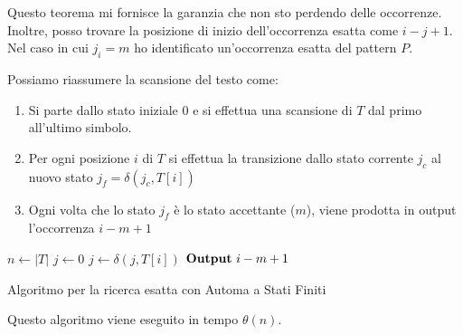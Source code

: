 Questo teorema mi fornisce la garanzia che non sto perdendo delle occorrenze.
Inoltre, posso trovare la posizione di inizio dell'occorrenza esatta come $i - j + 1$.
Nel caso in cui $j_i = m$ ho identificato un'occorrenza esatta del pattern $P$.

Possiamo riassumere la scansione del testo come:
\begin{enumerate}
    \item Si parte dallo stato iniziale $0$ e si effettua una scansione di $T$
          dal primo all'ultimo simbolo.
    \item Per ogni posizione $i$ di $T$ si effettua la transizione dallo stato
          corrente $j_c$ al nuovo stato $j_f = \delta(j_c, T[i])$
    \item Ogni volta che lo stato $j_f$ è lo stato accettante ($m$), viene prodotta
          in output l'occorrenza $i - m + 1$
\end{enumerate}
\begin{algorithm}
    \begin{algorithmic}
        \State $n \gets |T|$
        \State $j \gets 0$
        \State $j \gets \delta(j, T[i])$
        \State $\text{\textbf{Output}} \ i - m + 1$
        \EndIf
        \EndFor
        \EndFunction
    \end{algorithmic}
    \caption{Algoritmo per la ricerca esatta con Automa a Stati Finiti}
\end{algorithm}
Questo algoritmo viene eseguito in tempo $\theta(n)$.
